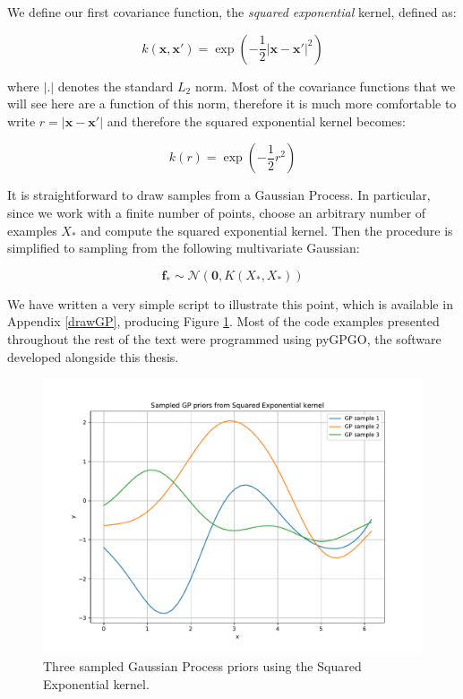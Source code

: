 \documentclass[10pt,a4paper,twoside]{book}
\begin{document}
We define our first covariance function, the \textit{squared exponential} kernel, defined as:

\begin{equation}
k(\boldsymbol{x}, \boldsymbol{x}') = \exp\left(-\dfrac{1}{2}|\boldsymbol{x} - \boldsymbol{x}'|^2\right)
\end{equation}

where $|.|$ denotes the standard $L_2$ norm. Most of the covariance functions that we will see here are a function of this norm, therefore it is much more comfortable to write $r = |\boldsymbol{x} - \boldsymbol{x}'|$ and therefore the squared exponential kernel becomes:

\begin{equation}
\label{sqexp}
k(r) = \exp\left(-\dfrac{1}{2}r^2\right)
\end{equation}

It is straightforward to draw samples from a Gaussian Process. In particular, since we work with a finite number of points, choose an arbitrary number of examples $X_*$ and compute the squared exponential kernel. Then the procedure is simplified to sampling from the following multivariate Gaussian:

\begin{equation}
\label{fprior}
\boldsymbol{f_*} \sim \mathcal{N}\left(\boldsymbol{0}, K(X_*, X_*)\right)
\end{equation}


We have written a very simple script to illustrate this point, which is available in Appendix \ref{drawGP}, producing Figure \ref{fig:drawPrior}. Most of the code examples presented throughout the rest of the text were programmed using pyGPGO, the software developed alongside this thesis.\\

\begin{figure}
\caption{Three sampled Gaussian Process priors using the Squared Exponential kernel.}
\label{fig:drawPrior}
\includegraphics[width=\textwidth]{figures/chapter2/drawPrior}
\end{figure}
\end{document}
